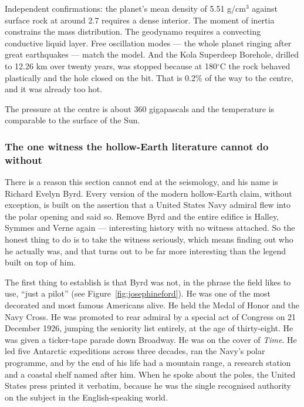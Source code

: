 Independent confirmations: the planet's mean density of 5.51 g/cm$^3$ against surface rock at
around 2.7 requires a dense interior. The moment of inertia constrains the mass distribution. The
geodynamo requires a convecting conductive liquid layer. Free oscillation modes --- the whole planet
ringing after great earthquakes --- match the model. And the Kola Superdeep Borehole, drilled to
12.26 km over twenty years, was stopped because at 180$^\circ$C the rock behaved plastically and
the hole closed on the bit. That is 0.2\% of the way to the centre, and it was already too hot.

The pressure at the centre is about 360 gigapascals and the temperature is comparable to the
surface of the Sun. 

\Needspace*{0.40\textheight}
\subsubsection*{The one witness the hollow-Earth literature cannot do without}

There is a reason this section cannot end at the seismology, and his name is Richard Evelyn Byrd.
Every version of the modern hollow-Earth claim, without exception, is built on the assertion that a
United States Navy admiral flew into the polar opening and said so. Remove Byrd and the entire
edifice is Halley, Symmes and Verne again --- interesting history with no witness attached. So the
honest thing to do is to take the witness seriously, which means finding out who he actually was,
and that turns out to be far more interesting than the legend built on top of him.

The first thing to establish is that Byrd was not, in the phrase the field likes to use, ``just a
pilot'' (see Figure~\ref{fig:josephineford}). He was one of the most decorated and most famous
Americans alive. He held the Medal of Honor and the Navy Cross. He was promoted to rear admiral by
a special act of Congress on 21 December 1926, jumping the seniority list entirely, at the age of
thirty-eight. He was given a ticker-tape parade down Broadway. He was on the cover of \emph{Time}.
He led five Antarctic expeditions across three decades, ran the Navy's polar programme, and by the
end of his life had a mountain range, a research station and a coastal shelf named after him. When
he spoke about the poles, the United States press printed it verbatim, because he was the single
recognised authority on the subject in the English-speaking world.

